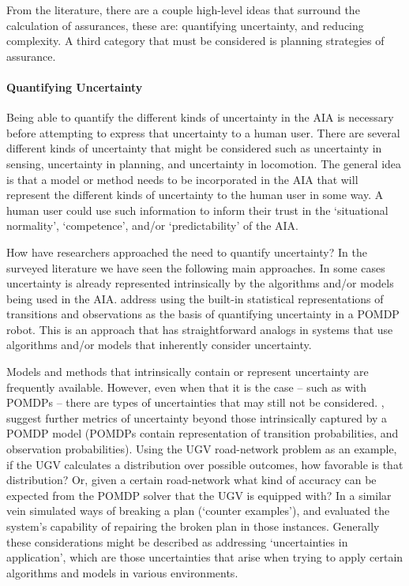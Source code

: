     From the literature, there are a couple high-level ideas that surround the calculation of assurances, these are: quantifying uncertainty, and reducing complexity. A third category that must be considered is planning strategies of assurance.

    \paragraph{Quantifying Uncertainty} Being able to quantify the different kinds of uncertainty in the AIA is necessary before attempting to express that uncertainty to a human user. There are several different kinds of uncertainty that might be considered such as uncertainty in sensing, uncertainty in planning, and uncertainty in locomotion. The general idea is that a model or method needs to be incorporated in the AIA that will represent the different kinds of uncertainty to the human user in some way. A human user could use such information to inform their trust in the `situational normality', `competence', and/or `predictability' of the AIA. 

    How have researchers approached the need to quantify uncertainty? In the surveyed literature we have seen the following main approaches. In some cases uncertainty is already represented intrinsically by the algorithms and/or models being used in the AIA. \cite{Wang2016-id} address using the built-in statistical representations of transitions and observations as the basis of quantifying uncertainty in a POMDP robot. This is an approach that has straightforward analogs in systems that use algorithms and/or models that inherently consider uncertainty.

    Models and methods that intrinsically contain or represent uncertainty are frequently available. However, even when that it is the case -- such as with POMDPs -- there are types of uncertainties that may still not be considered. \citet{Aitken2016-fb}, suggest further metrics of uncertainty beyond those intrinsically captured by a POMDP model (POMDPs contain representation of transition probabilities, and observation probabilities). Using the UGV road-network problem as an example, if the UGV calculates a distribution over possible outcomes, how favorable is that distribution? Or, given a certain road-network what kind of accuracy can be expected from the POMDP solver that the UGV is equipped with? In a similar vein \cite{Kuter2012-bv} simulated ways of breaking a plan (`counter examples'), and evaluated the system's capability of repairing the broken plan in those instances. Generally these considerations might be described as addressing `uncertainties in application', which are those uncertainties that arise when trying to apply certain algorithms and models in various environments.

